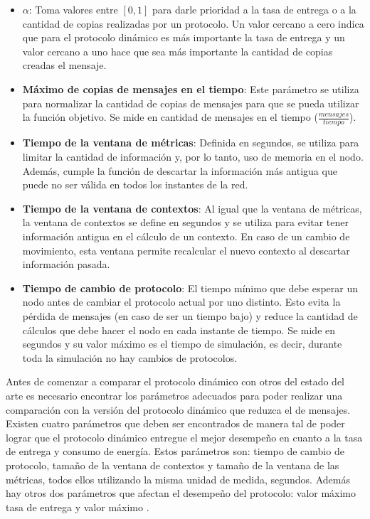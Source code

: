 \begin{itemize}
  \item \textbf{$\alpha$}: Toma valores entre $[0, 1]$ para darle prioridad a la tasa de
    entrega o a la cantidad de copias realizadas por un protocolo. Un valor
    cercano a cero indica que para el protocolo dinámico es más importante la
    tasa de entrega y un valor cercano a uno hace que sea más importante la
    cantidad de copias creadas el mensaje.
  \item \textbf{Máximo de copias de mensajes en el tiempo}: Este parámetro se
    utiliza para normalizar la cantidad de copias de mensajes para que se pueda
    utilizar la función objetivo. Se mide en cantidad de mensajes en el tiempo
    ($\frac{mensajes}{tiempo}$).
  \item \textbf{Tiempo de la ventana de métricas}: Definida en segundos, se
    utiliza para limitar la cantidad de información y, por lo tanto, uso de
    memoria en el nodo. Además, cumple la función de descartar la información
    más antigua que puede no ser válida en todos los instantes de la red.
  \item \textbf{Tiempo de la ventana de contextos}: Al igual que la ventana de
    métricas, la ventana de contextos se define en segundos y se utiliza para
    evitar tener información antigua en el cálculo de un contexto. En caso de un
    cambio de movimiento, esta ventana permite recalcular el nuevo contexto al
    descartar información pasada.
  \item \textbf{Tiempo de cambio de protocolo}: El tiempo mínimo que debe
    esperar un nodo antes de cambiar el protocolo actual por uno distinto. Esto
    evita la pérdida de mensajes (en caso de ser un tiempo bajo) y reduce la
    cantidad de cálculos que debe hacer el nodo en cada instante de tiempo. Se
    mide en segundos y su valor máximo es el tiempo de simulación, es decir,
    durante toda la simulación no hay cambios de protocolos.
\end{itemize}








Antes de comenzar a comparar el protocolo dinámico con otros del estado del arte
es necesario encontrar los parámetros adecuados para poder realizar una
comparación con la versión del protocolo dinámico que reduzca el \overhead{} de
mensajes. Existen cuatro parámetros que deben ser encontrados de manera tal de
poder lograr que el protocolo dinámico entregue el mejor desempeño en cuanto a
la tasa de entrega y consumo de energía. Estos parámetros son: tiempo de cambio
de protocolo, tamaño de la ventana de contextos y tamaño de la ventana de las
métricas, todos ellos utilizando la misma unidad de medida, segundos. Además hay
otros dos parámetros que afectan el desempeño del protocolo: valor máximo tasa
de entrega y valor máximo \overhead.

